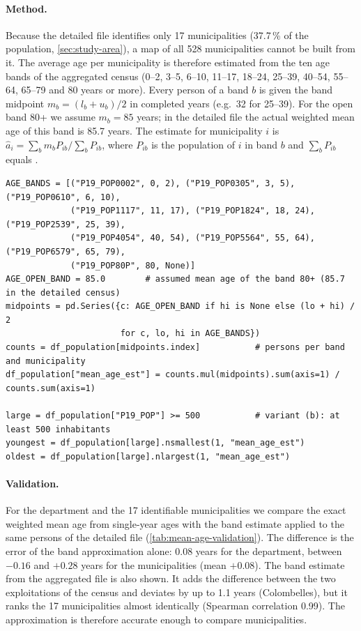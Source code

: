 \paragraph{Method.}
Because the detailed file identifies only 17 municipalities (37.7\,\% of the population, \cref{sec:study-area}), a
map of all 528 municipalities cannot be built from it. The average age per municipality is therefore estimated from
the ten age bands of the aggregated census (0--2, 3--5, 6--10, 11--17, 18--24, 25--39, 40--54, 55--64, 65--79 and
80 years or more). Every person of a band $b$ is given the band midpoint $m_b = (l_b + u_b)/2$ in completed years
(e.g.\ 32 for 25--39). For the open band 80+ we assume $m_b = 85$ years; in the detailed file the actual weighted mean
age of this band is 85.7 years. The estimate for municipality $i$ is
$\hat a_i = \sum_b m_b P_{ib} / \sum_b P_{ib}$, where $P_{ib}$ is the population of $i$ in band $b$ and
$\sum_b P_{ib}$ equals .
\begin{lstlisting}[style=py]
AGE_BANDS = [("P19_POP0002", 0, 2), ("P19_POP0305", 3, 5), ("P19_POP0610", 6, 10),
             ("P19_POP1117", 11, 17), ("P19_POP1824", 18, 24), ("P19_POP2539", 25, 39),
             ("P19_POP4054", 40, 54), ("P19_POP5564", 55, 64), ("P19_POP6579", 65, 79),
             ("P19_POP80P", 80, None)]
AGE_OPEN_BAND = 85.0        # assumed mean age of the band 80+ (85.7 in the detailed census)
midpoints = pd.Series({c: AGE_OPEN_BAND if hi is None else (lo + hi) / 2
                       for c, lo, hi in AGE_BANDS})
counts = df_population[midpoints.index]           # persons per band and municipality
df_population["mean_age_est"] = counts.mul(midpoints).sum(axis=1) / counts.sum(axis=1)

large = df_population["P19_POP"] >= 500           # variant (b): at least 500 inhabitants
youngest = df_population[large].nsmallest(1, "mean_age_est")
oldest = df_population[large].nlargest(1, "mean_age_est")
\end{lstlisting}

\paragraph{Validation.}
For the department and the 17 identifiable municipalities we compare the exact weighted mean age from single-year
ages with the band estimate applied to the same persons of the detailed file (\cref{tab:mean-age-validation}). The
difference is the error of the band approximation alone: 0.08 years for the department, between $-0.16$ and $+0.28$
years for the municipalities (mean $+0.08$). The band estimate from the aggregated file is also shown. It adds the
difference between the two exploitations of the census and deviates by up to 1.1 years (Colombelles), but it ranks
the 17 municipalities almost identically (Spearman correlation 0.99). The approximation is therefore accurate enough
to compare municipalities.

